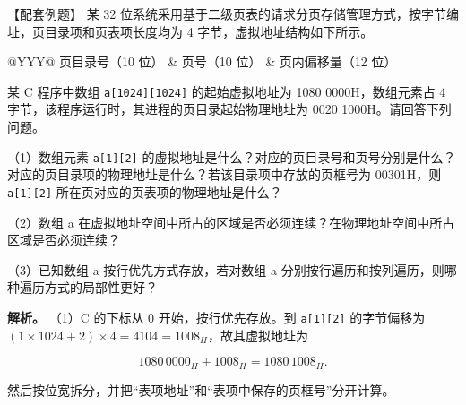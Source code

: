 \begin{example}[配套例题]

【配套例题】 某 32 位系统采用基于二级页表的请求分页存储管理方式，按字节编址，页目录项和页表项长度均为 4 字节，虚拟地址结构如下所示。

\begin{wideblock}

\par\medskip\noindent\begin{minipage}{\linewidth}\fontsize{9.3}{12}\selectfont\begin{tabularx}{\linewidth}{@{}YYY@{}}
\toprule\noalign{}
页目录号（10 位） & 页号（10 位） & 页内偏移量（12 位） \\
\midrule\noalign{}


\bottomrule\end{tabularx}
\end{minipage}\par\medskip

\end{wideblock}

某 C 程序中数组 \texttt{a[1024][1024]} 的起始虚拟地址为 1080 0000H，数组元素占 4 字节，该程序运行时，其进程的页目录起始物理地址为 0020 1000H。请回答下列问题。

（1）数组元素 \texttt{a[1][2]} 的虚拟地址是什么？对应的页目录号和页号分别是什么？对应的页目录项的物理地址是什么？若该目录项中存放的页框号为 00301H，则 \texttt{a[1][2]} 所在页对应的页表项的物理地址是什么？

（2）数组 a 在虚拟地址空间中所占的区域是否必须连续？在物理地址空间中所占区域是否必须连续？

（3）已知数组 a 按行优先方式存放，若对数组 a 分别按行遍历和按列遍历，则哪种遍历方式的局部性更好？

\end{example}

\textbf{解析。} （1）C 的下标从 0 开始，按行优先存放。到 \texttt{a[1][2]} 的字节偏移为 \((1\times1024+2)\times4=4104=1008_H\)，故其虚拟地址为

\[1080\,0000_H+1008_H=1080\,1008_H.\]

然后按位宽拆分，并把``表项地址''和``表项中保存的页框号''分开计算。

